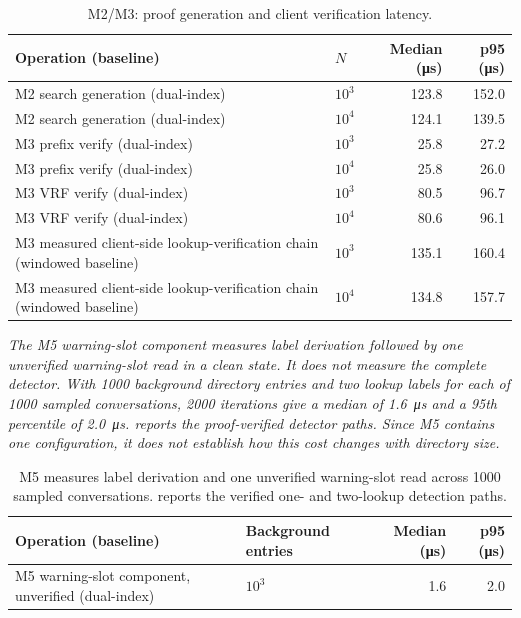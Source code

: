 \begin{table}[H]
\centering
\caption{M2/M3: proof generation and client verification latency.}
\label{tab:bench-latency}
\small
\begin{tabular}{@{}L{6.2cm}lrr@{}}
\toprule
Operation (baseline) & $N$ & Median (\si{\micro\second}) & p95 (\si{\micro\second}) \\
\midrule
M2 search generation (dual-index)    & $10^3$ & 123.8 & 152.0 \\
M2 search generation (dual-index)    & $10^4$ & 124.1 & 139.5 \\
M3 prefix verify (dual-index)        & $10^3$ & 25.8 & 27.2 \\
M3 prefix verify (dual-index)        & $10^4$ & 25.8 & 26.0 \\
M3 VRF verify (dual-index)           & $10^3$ & 80.5 & 96.7 \\
M3 VRF verify (dual-index)           & $10^4$ & 80.6 & 96.1 \\
M3 measured client-side lookup-verification chain (windowed baseline) & $10^3$ & 135.1 & 160.4 \\
M3 measured client-side lookup-verification chain (windowed baseline) & $10^4$ & 134.8 & 157.7 \\
\bottomrule
\end{tabular}
\end{table}

\medskip\noindent\emph{The M5 warning-slot component measures label derivation followed by one
unverified warning-slot read in a clean state. It does not measure the complete detector. With
\num{1000} background directory entries and two lookup labels for each of \num{1000} sampled
conversations, \num{2000} iterations give a median of \SI{1.6}{\micro\second} and a 95th percentile
of \SI{2.0}{\micro\second}.
 reports the proof-verified detector paths. Since M5 contains one
configuration, it does not establish how this cost changes with directory size.}

\begin{table}[H]
\centering
\caption[M5: unverified warning-slot read.]{M5 measures label derivation and one unverified
warning-slot read across \num{1000} sampled conversations.  reports the
verified one- and two-lookup detection paths.}
\label{tab:bench-detection}
\small
\begin{tabular}{@{}llrr@{}}
\toprule
Operation (baseline) & Background entries & Median (\si{\micro\second}) & p95 (\si{\micro\second}) \\
\midrule
M5 warning-slot component, unverified (dual-index) & $10^3$ & 1.6 & 2.0 \\
\bottomrule
\end{tabular}
\end{table}

